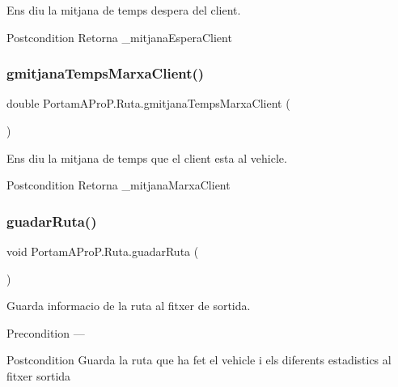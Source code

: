 Ens diu la mitjana de temps d\textquotesingle{}espera del client. 

\begin{DoxyPostcond}{Postcondition}
Retorna \+\_\+mitjana\+Espera\+Client 
\end{DoxyPostcond}
\mbox{\label{class_portam_a_pro_p_1_1_ruta_a81a83db89e12c72adff5e59539a7a8d1}} 
\subsubsection{\texorpdfstring{gmitjana\+Temps\+Marxa\+Client()}{gmitjanaTempsMarxaClient()}}
{\footnotesize\ttfamily double Portam\+A\+Pro\+P.\+Ruta.\+gmitjana\+Temps\+Marxa\+Client (\begin{DoxyParamCaption}{ }\end{DoxyParamCaption})}



Ens diu la mitjana de temps que el client esta al vehicle. 

\begin{DoxyPostcond}{Postcondition}
Retorna \+\_\+mitjana\+Marxa\+Client 
\end{DoxyPostcond}
\mbox{\label{class_portam_a_pro_p_1_1_ruta_addebfd63d9ae2e9797d755dcba205ac4}} 
\subsubsection{\texorpdfstring{guadar\+Ruta()}{guadarRuta()}}
{\footnotesize\ttfamily void Portam\+A\+Pro\+P.\+Ruta.\+guadar\+Ruta (\begin{DoxyParamCaption}{ }\end{DoxyParamCaption})}



Guarda informacio de la ruta al fitxer de sortida. 

\begin{DoxyPrecond}{Precondition}
--- 
\end{DoxyPrecond}
\begin{DoxyPostcond}{Postcondition}
Guarda la ruta que ha fet el vehicle i els diferents estadistics al fitxer sortida 
\end{DoxyPostcond}
\mbox{\label{class_portam_a_pro_p_1_1_ruta_afb5d2dd60a54765c4764866f9cc78fc8}} 

